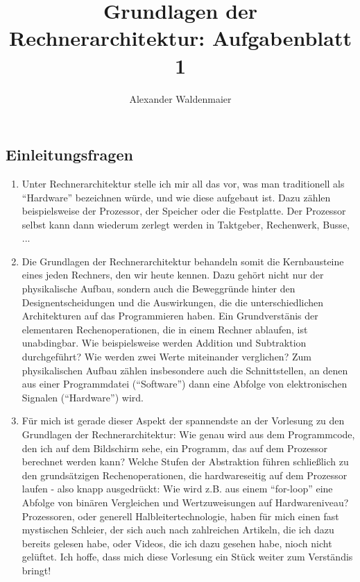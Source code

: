 \documentclass{article}
\title{Grundlagen der Rechnerarchitektur: Aufgabenblatt 1}
\author{Alexander Waldenmaier}
\begin{document}
    \maketitle

    \subsection*{Einleitungsfragen}
    \begin{enumerate}
        \item Unter Rechnerarchitektur stelle ich mir all das vor, was man traditionell als "`Hardware"' bezeichnen würde, und wie diese aufgebaut ist. Dazu zählen beispielsweise der Prozessor, der Speicher oder die Festplatte. Der Prozessor selbst kann dann wiederum zerlegt werden in Taktgeber, Rechenwerk, Busse, ... 
        \item Die Grundlagen der Rechnerarchitektur behandeln somit die Kernbausteine eines jeden Rechners, den wir heute kennen. Dazu gehört nicht nur der physikalische Aufbau, sondern auch die Beweggründe hinter den Designentscheidungen und die Auswirkungen, die die unterschiedlichen Architekturen auf das Programmieren haben. Ein Grundverstänis der elementaren Rechenoperationen, die in einem Rechner ablaufen, ist unabdingbar. Wie beispielsweise werden Addition und Subtraktion durchgeführt? Wie werden zwei Werte miteinander verglichen? Zum physikalischen Aufbau zählen insbesondere auch die Schnittstellen, an denen aus einer Programmdatei ("`Software"') dann eine Abfolge von elektronischen Signalen ("`Hardware"') wird. 
        \item Für mich ist gerade dieser Aspekt der spannendste an der Vorlesung zu den Grundlagen der Rechnerarchitektur: Wie genau wird aus dem Programmcode, den ich auf dem Bildschirm sehe, ein Programm, das auf dem Prozessor berechnet werden kann? Welche Stufen der Abstraktion führen schließlich zu den grundsätzigen Rechenoperationen, die hardwareseitig auf dem Prozessor laufen - also knapp ausgedrückt: Wie wird z.B. aus einem "`for-loop"' eine Abfolge von binären Vergleichen und Wertzuweisungen auf Hardwareniveau? Prozessoren, oder generell Halbleitertechnologie, haben für mich einen fast mystischen Schleier, der sich auch nach zahlreichen Artikeln, die ich dazu bereits gelesen habe, oder Videos, die ich dazu gesehen habe, nioch nicht gelüftet. Ich hoffe, dass mich diese Vorlesung ein Stück weiter zum Verständis bringt! 
    \end{enumerate}
\end{document}
